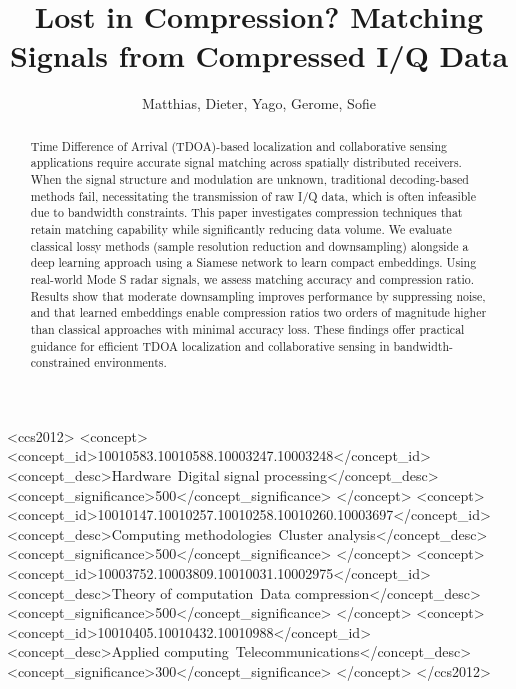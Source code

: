 \documentclass[sigconf, 10pt, nonacm, anonymous]{acmart}  %
\begin{document}
\title{Lost in Compression? Matching Signals from Compressed I/Q Data}



\author{Matthias, Dieter, Yago, Gerome, Sofie}

\begin{abstract}
Time Difference of Arrival (TDOA)-based localization and collaborative sensing applications require accurate signal matching across spatially distributed receivers. When the signal structure and modulation are unknown, traditional decoding-based methods fail, necessitating the transmission of raw I/Q data, which is often infeasible due to bandwidth constraints. This paper investigates compression techniques that retain matching capability while significantly reducing data volume. We evaluate classical lossy methods (sample resolution reduction and downsampling) alongside a deep learning approach using a Siamese network to learn compact embeddings. Using real-world Mode S radar signals, we assess matching accuracy and compression ratio. Results show that moderate downsampling improves performance by suppressing noise, and that learned embeddings enable compression ratios two orders of magnitude higher than classical approaches with minimal accuracy loss. These findings offer practical guidance for efficient TDOA localization and collaborative sensing in bandwidth-constrained environments.
\end{abstract}

\begin{CCSXML}
<ccs2012>
   <concept>
       <concept_id>10010583.10010588.10003247.10003248</concept_id>
       <concept_desc>Hardware~Digital signal processing</concept_desc>
       <concept_significance>500</concept_significance>
       </concept>
   <concept>
       <concept_id>10010147.10010257.10010258.10010260.10003697</concept_id>
       <concept_desc>Computing methodologies~Cluster analysis</concept_desc>
       <concept_significance>500</concept_significance>
       </concept>
   <concept>
       <concept_id>10003752.10003809.10010031.10002975</concept_id>
       <concept_desc>Theory of computation~Data compression</concept_desc>
       <concept_significance>500</concept_significance>
       </concept>
   <concept>
       <concept_id>10010405.10010432.10010988</concept_id>
       <concept_desc>Applied computing~Telecommunications</concept_desc>
       <concept_significance>300</concept_significance>
       </concept>
 </ccs2012>
\end{CCSXML}
\end{document}
